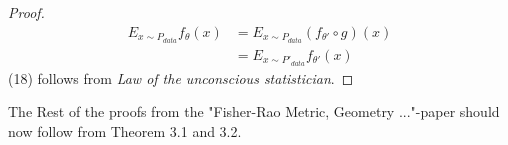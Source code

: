 \documentclass[a4paper]{article}
\theoremstyle{definition}
\begin{document}
\begin{proof}
    \begin{align}
        E_{x \sim P_{data}}f_{\theta}(x) &= E_{x \sim P_{data}} (f_{\theta'} \circ g)(x)\\
        &= E_{x \sim P'_{data}}f_{\theta'}(x)
    \end{align}
    (18) follows from \textit{Law of the unconscious statistician}.
\end{proof}

The Rest of the proofs from the "Fisher-Rao Metric, Geometry ..."-paper should now follow from Theorem 3.1 and 3.2.




\end{document}
